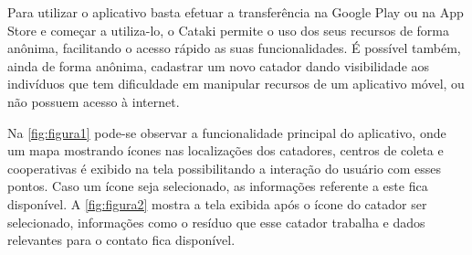 \documentclass[
	12pt,				%
	openright,			%
	twoside,			%
	a4paper,			%
	english,			%
	french,				%
	spanish,			%
	brazil				%
	]{abntex2}
\begin{document}
Para utilizar o aplicativo basta efetuar a transferência na Google Play\cite{googleplay} ou na App Store\cite{appstore} e começar a utiliza-lo, o Cataki permite o uso dos seus recursos de forma anônima, facilitando o acesso rápido as suas funcionalidades. É possível também, ainda de forma anônima, cadastrar um novo catador dando visibilidade aos indivíduos que tem dificuldade em manipular recursos de um aplicativo móvel, ou não possuem acesso à internet.

Na \autoref{fig:figura1} pode-se observar a funcionalidade principal do aplicativo, onde um mapa mostrando ícones nas localizações dos catadores, centros de coleta e cooperativas é exibido na tela possibilitando a interação do usuário com esses pontos. Caso um ícone seja selecionado, as informações referente a este fica disponível. A \autoref{fig:figura2} mostra a tela exibida após o ícone do catador ser selecionado, informações como o resíduo que esse catador trabalha e dados relevantes para o contato fica disponível. \\
    
\end{document}
